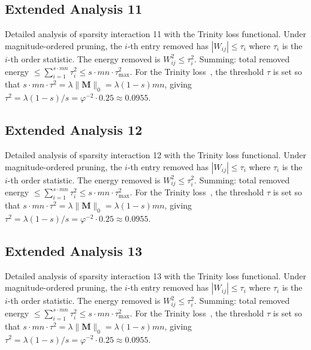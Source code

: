 \subsection{Extended Analysis 11}
\label{subsec:ext-11}

Detailed analysis of sparsity interaction 11 with the Trinity
loss functional.  Under magnitude-ordered pruning, the $i$-th entry removed has
$|W_{ij}| \leq \tau_i$ where $\tau_i$ is the $i$-th order statistic.  The
energy removed is $W_{ij}^2 \leq \tau_i^2$.  Summing: total removed energy
$\leq \sum_{i=1}^{s \cdot mn} \tau_i^2 \leq s \cdot mn \cdot \tau_{\max}^2$.
For the Trinity loss~\cite{hanetal2015deep}, the threshold $\tau$ is set so that
$s \cdot mn \cdot \tau^2 = \lambda \|\mathbf{M}\|_0 = \lambda (1-s) mn$, giving
$\tau^2 = \lambda(1-s)/s = \varphi^{-2} \cdot 0.25 \approx 0.0955$.


\subsection{Extended Analysis 12}
\label{subsec:ext-12}

Detailed analysis of sparsity interaction 12 with the Trinity
loss functional.  Under magnitude-ordered pruning, the $i$-th entry removed has
$|W_{ij}| \leq \tau_i$ where $\tau_i$ is the $i$-th order statistic.  The
energy removed is $W_{ij}^2 \leq \tau_i^2$.  Summing: total removed energy
$\leq \sum_{i=1}^{s \cdot mn} \tau_i^2 \leq s \cdot mn \cdot \tau_{\max}^2$.
For the Trinity loss~\cite{hanetal2015deep}, the threshold $\tau$ is set so that
$s \cdot mn \cdot \tau^2 = \lambda \|\mathbf{M}\|_0 = \lambda (1-s) mn$, giving
$\tau^2 = \lambda(1-s)/s = \varphi^{-2} \cdot 0.25 \approx 0.0955$.


\subsection{Extended Analysis 13}
\label{subsec:ext-13}

Detailed analysis of sparsity interaction 13 with the Trinity
loss functional.  Under magnitude-ordered pruning, the $i$-th entry removed has
$|W_{ij}| \leq \tau_i$ where $\tau_i$ is the $i$-th order statistic.  The
energy removed is $W_{ij}^2 \leq \tau_i^2$.  Summing: total removed energy
$\leq \sum_{i=1}^{s \cdot mn} \tau_i^2 \leq s \cdot mn \cdot \tau_{\max}^2$.
For the Trinity loss~\cite{hanetal2015deep}, the threshold $\tau$ is set so that
$s \cdot mn \cdot \tau^2 = \lambda \|\mathbf{M}\|_0 = \lambda (1-s) mn$, giving
$\tau^2 = \lambda(1-s)/s = \varphi^{-2} \cdot 0.25 \approx 0.0955$.


